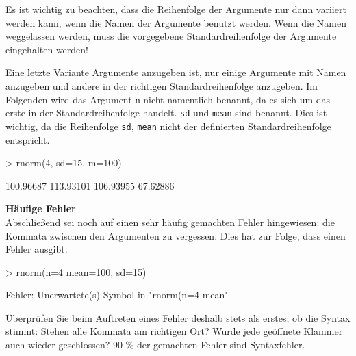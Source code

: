 Es ist wichtig zu beachten, dass die Reihenfolge der Argumente nur dann variiert werden kann, wenn die Namen der Argumente benutzt werden. Wenn die Namen weggelassen werden, muss die vorgegebene  Standardreihenfolge  der Argumente eingehalten werden! %
% 

Eine letzte Variante Argumente anzugeben ist, nur einige Argumente mit Namen anzugeben und andere in der richtigen  Standardreihenfolge  anzugeben. Im Folgenden wird das Argument \texttt{n} nicht namentlich benannt, da es sich um das erste in der Standardreihenfolge handelt. \texttt{sd} und \texttt{mean} sind benannt. Dies ist wichtig, da die Reihenfolge \texttt{sd}, \texttt{mean} nicht der definierten Standardreihenfolge entspricht.
                                    
\begin{Schunk}
\begin{Sinput}
> rnorm(4, sd=15, m=100)
\end{Sinput}
\begin{Soutput}
[1] 100.96687 113.93101 106.93955  67.62886
\end{Soutput}
\end{Schunk}

\vspace*{5mm}
\textbf{Häufige Fehler} \\
  
Abschließend sei noch auf einen sehr häufig gemachten Fehler hingewiesen: die Kommata zwischen den Argumenten zu vergessen. Dies hat zur Folge, dass \R{} einen Fehler ausgibt.

\begin{Schunk}
\begin{Sinput}
> rnorm(n=4  mean=100, sd=15)
\end{Sinput}
\end{Schunk}
\vspace{-5mm}
\begin{Schunk}
\begin{Soutput}
Fehler: Unerwartete(s) Symbol in "rnorm(n=4  mean"
\end{Soutput}
\end{Schunk}

Überprüfen Sie beim Auftreten eines Fehler deshalb stets als erstes, ob die Syntax stimmt: Stehen alle Kommata am richtigen Ort? Wurde jede geöffnete Klammer auch wieder geschlossen? 90 \% der gemachten Fehler sind Syntaxfehler.

